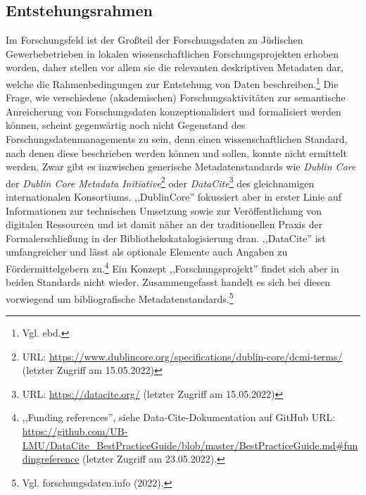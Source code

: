 \subsection{Entstehungsrahmen}

Im Forschungsfeld ist der Großteil der Forschungsdaten zu Jüdischen Gewerbebetrieben in lokalen wissenschaftlichen Forschungsprojekten erhoben worden, daher stellen vor allem sie die relevanten deskriptiven Metadaten dar, welche die Rahmenbedingungen zur Entstehung von Daten beschreiben.\footnote{Vgl. ebd.} Die Frage, wie verschiedene (akademischen) Forschungsaktivitäten zur semantische Anreicherung von Forschungsdaten konzeptionalisiert und formalisiert werden können, scheint gegenwärtig noch nicht Gegenstand des Forschungsdatenmanagements zu sein, denn einen wissenschaftlichen Standard, nach denen diese beschrieben werden können und sollen, konnte nicht ermittelt werden. Zwar gibt es inzwischen generische Metadatenstandards wie \textit{Dublin Core} der \textit{Dublin Core Metadata Initiative}\footnote{URL: \url{https://www.dublincore.org/specifications/dublin-core/dcmi-terms/} (letzter Zugriff am 15.05.2022)} oder \textit{DataCite}\footnote{URL: \url{https://datacite.org/} (letzter Zugriff am 15.05.2022)} des gleichnamigen internationalen Konsortiums. ,,DublinCore'' fokussiert aber in erster Linie auf Informationen zur technischen Umsetzung sowie zur Veröffentlichung von digitalen Ressourcen und ist damit näher an der traditionellen Praxis der Formalerschließung in der Bibliothekskatalogisierung dran. ,,DataCite'' ist umfangreicher und lässt als optionale Elemente auch Angaben zu Fördermittelgebern zu.\footnote{,,Funding references'', siehe Data-Cite-Dokumentation auf GitHub URL: \url{https://github.com/UB-LMU/DataCite\_BestPracticeGuide/blob/master/BestPracticeGuide.md\#fundingreference} (letzter Zugriff am 23.05.2022).} Ein Konzept ,,Forschungsprojekt'' findet sich aber in beiden Standards nicht wieder. Zusammengefasst handelt es sich bei diesen vorwiegend um bibliografische Metadatenstandards.\footnote{Vgl. forschungsdaten.info (2022).} 

